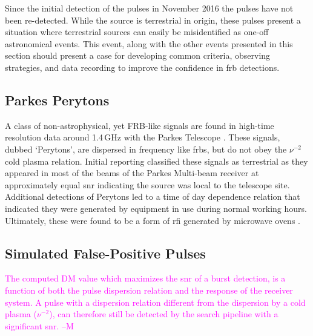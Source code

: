 \documentclass[a4paper,fleqn,usenatbib]{mnras}
\newcommand{\cM}[1]{\textcolor{magenta}{ #1 --M}}
\begin{document}
Since the initial detection of the pulses in November 2016 the pulses have not
been re-detected. While the source is terrestrial in origin, these pulses
present a situation where terrestrial sources can easily be misidentified as
one-off astronomical events. This event, along with the other events presented
in this section should present a case for developing common criteria, observing
strategies, and data recording to improve the confidence in \gls{frb}
detections.

\subsection{Parkes Perytons}

A class of non-astrophysical, yet FRB-like signals are found in high-time
resolution data around 1.4\,GHz with the Parkes Telescope
\citep{2011ApJ...727...18B}. These signals, dubbed `Perytons', are dispersed in
frequency like \glspl{frb}, but do not obey the $\nu^{-2}$ cold plasma relation.
Initial reporting classified these signals as terrestrial as they appeared in
most of the beams of the Parkes Multi-beam receiver at approximately equal
\gls{snr} indicating the source was local to the telescope site. Additional
detections of Perytons led to a time of day dependence relation that indicated
they were generated by equipment in use during normal working hours.
Ultimately, these were found to be a form of \gls{rfi} generated by microwave
ovens \citep{2015MNRAS.451.3933P}.

\subsection{Simulated False-Positive Pulses}
\label{sec:sim_pulses}

\cM{The computed DM value which maximizes the \gls{snr} of a burst detection, is a function of both the pulse dispersion relation and the response of the receiver system. A pulse with a dispersion relation different from the dispersion by a cold plasma ($\nu^{-2}$), can therefore still be detected by the search pipeline with a significant \gls{snr}.}

\end{document}
